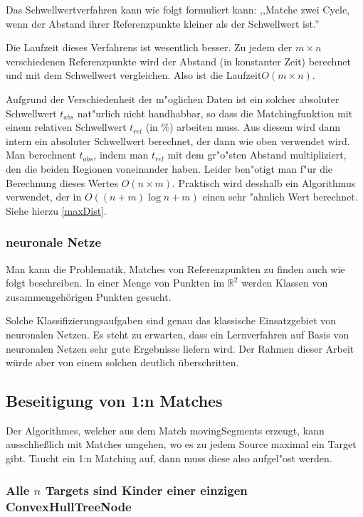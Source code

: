Das Schwellwertverfahren kann wie folgt formuliert kann: ,,Matche zwei Cycle, wenn der Abstand ihrer Referenzpunkte kleiner als der Schwellwert ist.''

Die Laufzeit dieses Verfahrens ist wesentlich besser. Zu jedem der $m\times n$ verschiedenen  Referenzpunkte wird der  Abstand (in konstanter Zeit) berechnet und mit dem Schwellwert vergleichen. Also ist die Laufzeit$O(m\times n)$.

Aufgrund der Verschiedenheit der m"oglichen Daten ist ein solcher absoluter Schwellwert $t_{abs}$ nat"urlich nicht handhabbar, so dass die Matchingfunktion mit einem relativen Schwellwert $t_{rel}$ (in \%) arbeiten muss. Aus diesem wird dann intern ein absoluter Schwellwert berechnet, der dann wie oben verwendet wird. Man berechnent $t_{abs}$, indem man $t_{rel}$ mit dem gr"o"sten Abstand multipliziert, den die beiden Regionen voneinander haben. Leider ben"otigt man f"ur die Berechnung dieses Wertes $O(n\times m)$. Praktisch wird desshalb ein Algorithmus verwendet, der in $O((n+m)\log{n+m})$ einen sehr "ahnlich Wert berechnet. Siehe hierzu \ref{maxDist}.

\subsubsection*{neuronale Netze}

Man kann die Problematik, Matches von Referenzpunkten zu finden auch wie folgt beschreiben. In einer Menge von Punkten im $\mathbb{R}^2$ werden Klassen von zusammengehörigen Punkten gesucht.

Solche Klassifizierungsaufgaben sind genau das klassische Einsatzgebiet von neuronalen Netzen. Es steht zu erwarten, dass ein Lernverfahren auf Basis von neuronalen Netzen sehr gute Ergebnisse liefern wird. Der Rahmen dieser Arbeit würde aber von einem solchen deutlich überschritten.

\subsection{Beseitigung von 1:n Matches}\label{1zuN}

Der Algorithmes, welcher aus dem Match movingSegments erzeugt, kann ausschließlich mit Matches umgehen, wo es zu jedem Source maximal ein Target gibt. Taucht ein 1:n Matching auf, dann muss diese also aufgel"ost werden. 

\subsubsection*{Alle $n$ Targets sind Kinder einer einzigen ConvexHullTreeNode}\label{JoinConc}

